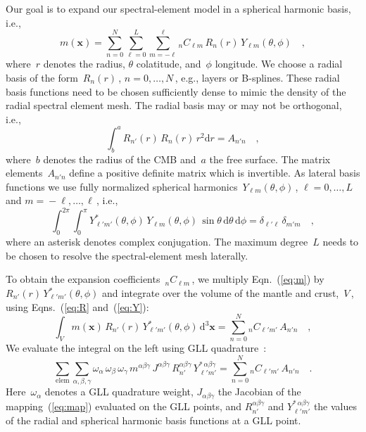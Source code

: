 \documentclass[extra,mreferee]{gji}
\begin{document}
Our goal is to expand our spectral-element model in a spherical harmonic basis, i.e.,
\begin{equation}
    m(\mathbf{x})=\sum_{n=0}^N\sum_{\ell = 0}^L\sum_{m=-\ell}^\ell {}_nC_{\ell m}\,R_n(r)\,Y_{\ell m}(\theta,\phi)
    \quad ,
    \label{eq:m}
\end{equation}
where~$r$ denotes the radius, $\theta$ colatitude, and~$\phi$ longitude.
We choose a radial basis of the form~$R_n(r)$\,, $n=0,\ldots,N$\,,
e.g., layers or B-splines.
These radial basis functions need to be chosen sufficiently dense to mimic the density of the radial spectral element mesh.
The radial basis may or may not be orthogonal,
i.e.,
\begin{equation}
    \int_b^a R_{n'}(r)\,R_{n}(r)\,r^2\mathrm{d}r = A_{n'n}
    \quad ,
    \label{eq:R}
\end{equation}
where~$b$ denotes the radius of the CMB and~$a$ the free surface.
The matrix elements~$A_{n'n}$ define a positive definite matrix which is invertible.
As lateral basis functions we use fully normalized spherical harmonics~$Y_{\ell m}(\theta,\phi)$\,, $\ell=0,\ldots,L$ and $m=\mbox{}-\ell,\ldots,\ell$\,, i.e.,~\citep{DT98}
\begin{equation}
    \int_0^{2\pi}\int_0^\pi Y^*_{\ell'm'}(\theta,\phi)\,Y_{\ell m}(\theta,\phi)\,\sin\theta\,\mathrm{d}\theta\,\mathrm{d}\phi = \delta_{\ell' \ell}\,\delta_{m'm}
    \quad ,
    \label{eq:Y}
\end{equation}
where an asterisk denotes complex conjugation.
The maximum degree~$L$ needs to be chosen to resolve the spectral-element mesh laterally.

To obtain the expansion coefficients~${}_nC_{\ell m}$\,, we multiply Eqn.~(\ref{eq:m}) by
$R_{n'}(r)\,Y^*_{\ell' m'}(\theta,\phi)$ and integrate over the volume of the mantle and crust,~$V$\,, using Eqns.~(\ref{eq:R} and~(\ref{eq:Y}):
\begin{equation}
    \int_V m(\mathbf{x})\,R_{n'}(r)\,Y^*_{\ell' m'}(\theta,\phi)\,\mathrm{d}^3\mathbf{x}=\sum_{n=0}^N {}_nC_{\ell' m'}\,A_{n'n}
    \quad ,
\end{equation}
We evaluate the integral on the left using GLL quadrature~\citep{KoTr99}:
\begin{equation}
    \sum_{\mathrm{elem}}\sum_{\alpha,\beta,\gamma}\omega_\alpha\,\omega_\beta\,\omega_\gamma\,m^{\alpha\beta\gamma}\,J^{\alpha\beta\gamma}\,R_{n'}^{\alpha\beta\gamma}\,Y_{\ell'm'}^{*\,\alpha\beta\gamma}
    =\sum_{n=0}^N {}_nC_{\ell' m'}\,A_{n'n}
    \quad .
\end{equation}
Here~$\omega_\alpha$ denotes a GLL quadrature weight,
$J_{\alpha\beta\gamma}$ the Jacobian of the mapping~(\ref{eq:map}) evaluated on the GLL points,
and $R_{n'}^{\alpha\beta\gamma}$ and $Y_{\ell'm'}^{*\,\alpha\beta\gamma}$ the values of the radial and spherical harmonic basis functions at a GLL point.
\end{document}
